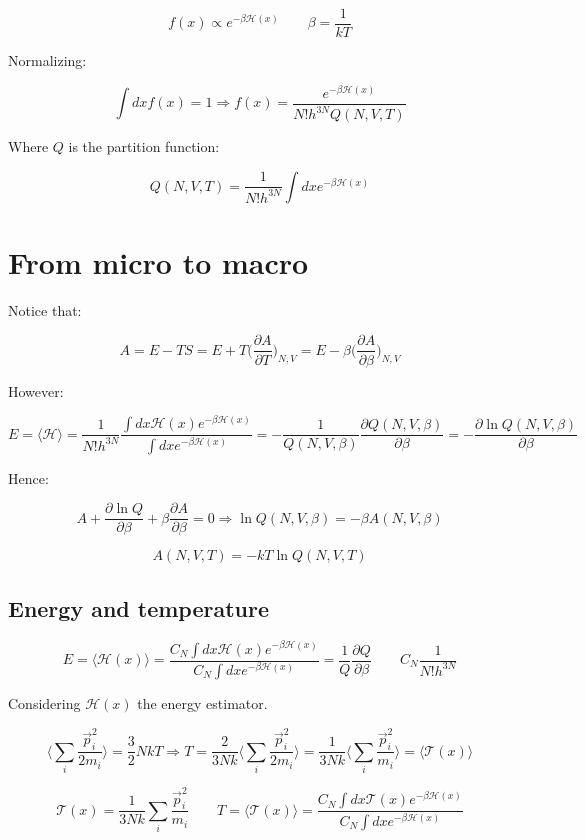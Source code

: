 	$$f(x)\propto e^{-\beta\mathcal{H}(x)}\qquad \beta=\frac{1}{kT}$$

	Normalizing:

	$$\int dxf(x) = 1\Rightarrow f(x) = \frac{e^{-\beta\mathcal{H}(x)}}{N!h^{3N}Q(N, V, T)}$$

	Where $Q$ is the partition function:

	$$Q(N, V, T) = \frac{1}{N!h^{3N}}\int dx e^{-\beta\mathcal{H}(x)}$$

\section{From micro to macro}

Notice that:

$$A = E-TS = E+T\biggl(\frac{\partial A}{\partial T}\biggr)_{N, V} = E-\beta\biggl(\frac{\partial A}{\partial \beta}\biggr)_{N, V}$$

However:

$$E = \langle\mathcal{H}\rangle = \frac{1}{N!h^{3N}}\frac{\int dx\mathcal{H}(x)e^{-\beta\mathcal{H}(x)}}{\int dx e^{-\beta\mathcal{H}(x)}} = -\frac{1}{Q(N, V, \beta)}\frac{\partial Q(N, V, \beta)}{\partial \beta} = -\frac{\partial\ln Q(N, V, \beta)}{\partial \beta}$$

Hence:

$$A + \frac{\partial \ln Q}{\partial \beta} +\beta\frac{\partial A}{\partial \beta} = 0\Rightarrow \ln Q(N, V, \beta)  = -\beta A(N, V, \beta)$$

$$A(N, V, T) = -kT\ln Q(N, V, T)$$

	\subsection{Energy and temperature}

	$$E = \langle\mathcal{H}(x)\rangle = \frac{C_N\int dx\mathcal{H}(x)e^{-\beta\mathcal{H}(x)}}{C_N\int dxe^{-\beta\mathcal{H}(x)}} = \frac{1}{Q}\frac{\partial Q}{\partial \beta}\qquad C_N\frac{1}{N!h^{3N}}$$

	Considering $\mathcal{H}(x)$ the energy estimator.

	$$\biggl\langle\sum\limits_{i}\frac{\vec{p}_i^2}{2m_i}\biggr\rangle = \frac{3}{2}NkT\Rightarrow T = \frac{2}{3Nk}\biggl\langle\sum\limits_i\frac{\vec{p}_i^2}{2m_i}\biggr\rangle = \frac{1}{3Nk}\biggl\langle\sum\limits_i\frac{\vec{p}_i^2}{m_i}\biggr\rangle = \langle\mathcal{T}(x)\rangle$$

	$$\mathcal{T}(x) = \frac{1}{3Nk}\sum\limits_i\frac{\vec{p}_i^2}{m_i}\qquad T = \langle\mathcal{T}(x)\rangle = \frac{C_N\int dx\mathcal{T}(x)e^{-\beta\mathcal{H}(x)}}{C_N\int dx e^{-\beta\mathcal{H}(x)}}$$

